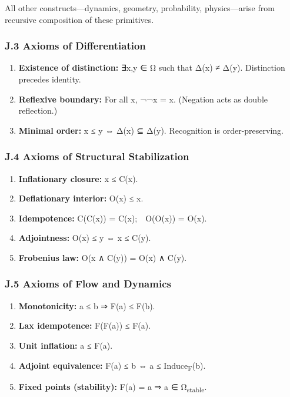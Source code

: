 \documentclass[11pt]{article}
\begin{document}
All other constructs—dynamics, geometry, probability, physics—arise  
from recursive composition of these primitives.
\subsubsection*{J.3 Axioms of Differentiation}
\label{sec:orgdd2c57c}
\begin{enumerate}
\item \textbf{\textbf{Existence of distinction:}}  
∃x,y ∈ Ω such that Δ(x) ≠ Δ(y).  
Distinction precedes identity.

\item \textbf{\textbf{Reflexive boundary:}}  
For all x, ¬¬x = x.  
(Negation acts as double reflection.)

\item \textbf{\textbf{Minimal order:}}  
x ≤ y ⇔ Δ(x) ⊆ Δ(y).  
Recognition is order-preserving.
\end{enumerate}
\subsubsection*{J.4 Axioms of Structural Stabilization}
\label{sec:org914ff28}
\begin{enumerate}
\item \textbf{\textbf{Inflationary closure:}} x ≤ C(x).
\item \textbf{\textbf{Deflationary interior:}} O(x) ≤ x.
\item \textbf{\textbf{Idempotence:}} C(C(x)) = C(x); O(O(x)) = O(x).
\item \textbf{\textbf{Adjointness:}} O(x) ≤ y ⇔ x ≤ C(y).
\item \textbf{\textbf{Frobenius law:}} O(x ∧ C(y)) = O(x) ∧ C(y).
\end{enumerate}
\subsubsection*{J.5 Axioms of Flow and Dynamics}
\label{sec:org89f70c8}
\begin{enumerate}
\item \textbf{\textbf{Monotonicity:}} a ≤ b ⇒ F(a) ≤ F(b).
\item \textbf{\textbf{Lax idempotence:}} F(F(a)) ≤ F(a).
\item \textbf{\textbf{Unit inflation:}} a ≤ F(a).
\item \textbf{\textbf{Adjoint equivalence:}} F(a) ≤ b ⇔ a ≤ Induce\textsubscript{F}(b).
\item \textbf{\textbf{Fixed points (stability):}} F(a) = a ⇒ a ∈ Ω\textsubscript{stable}.
\end{enumerate}
\end{document}
